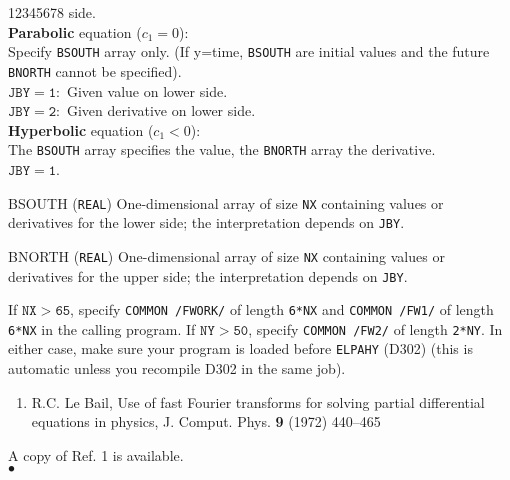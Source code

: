 \begin{DLtt}{12345678}
side.\\
{\bf Parabolic} equation ($c_1=0$):\\
Specify {\tt BSOUTH} array only. (If y=time, {\tt BSOUTH} are initial
values and the future {\tt BNORTH} cannot be specified). \\
$\mathtt{JBY=1:}$ Given value on lower side.\\
$\mathtt{JBY=2:}$ Given derivative on lower side.\\
{\bf Hyperbolic} equation ($c_1 <0 $):\\
The {\tt BSOUTH} array specifies the value, the {\tt BNORTH} array
the derivative.\\
$\mathtt{JBY=1}$.
\item [BSOUTH] ({\tt REAL}) One-dimensional  array of size {\tt NX}
containing values or derivatives for the lower side; the interpretation
depends on {\tt JBY}.
\item [BNORTH] ({\tt REAL}) One-dimensional  array of size {\tt NX}
containing values or derivatives for the upper side; the interpretation
depends on {\tt JBY}.
\end{DLtt}
\Notes
If $\mathtt{NX > 65}$, specify {\tt COMMON /FWORK/} of length {\tt 6*NX}
and {\tt COMMON /FW1/} of length {\tt 6*NX} in the calling program.
If $\mathtt{NY > 50}$, specify {\tt COMMON /FW2/} of length {\tt 2*NY}.
In either case, make sure your program is loaded
 before {\tt ELPAHY} (D302) (this is automatic unless you recompile D302
in the same job).
\Refer
\begin{enumerate}
\item R.C. Le Bail, Use of fast Fourier transforms for solving partial
differential equations in physics, J. Comput. Phys. {\bf 9} (1972)
440--465
\end{enumerate}
A copy of Ref. 1 is available.
\\ $\bullet$
